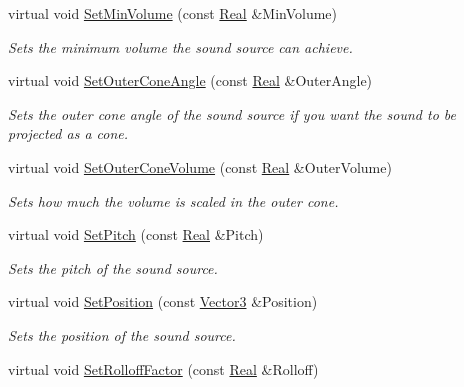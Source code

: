 \begin{DoxyCompactItemize}
virtual void \hyperlink{classMezzanine_1_1Audio_1_1Sound_aaa56d27a3dcbf2b6e8a4b3b1141ad766}{SetMinVolume} (const \hyperlink{namespaceMezzanine_a726731b1a7df72bf3583e4a97282c6f6}{Real} \&MinVolume)
\begin{DoxyCompactList}\small\item\em Sets the minimum volume the sound source can achieve. \item\end{DoxyCompactList}\item 
virtual void \hyperlink{classMezzanine_1_1Audio_1_1Sound_a9d851625bb64c7f4a77eef305464a7f7}{SetOuterConeAngle} (const \hyperlink{namespaceMezzanine_a726731b1a7df72bf3583e4a97282c6f6}{Real} \&OuterAngle)
\begin{DoxyCompactList}\small\item\em Sets the outer cone angle of the sound source if you want the sound to be projected as a cone. \item\end{DoxyCompactList}\item 
virtual void \hyperlink{classMezzanine_1_1Audio_1_1Sound_ae99b53a8dcb610bb0df055ba0cd118fa}{SetOuterConeVolume} (const \hyperlink{namespaceMezzanine_a726731b1a7df72bf3583e4a97282c6f6}{Real} \&OuterVolume)
\begin{DoxyCompactList}\small\item\em Sets how much the volume is scaled in the outer cone. \item\end{DoxyCompactList}\item 
virtual void \hyperlink{classMezzanine_1_1Audio_1_1Sound_a5c73f4cfc446e8760c5770c1e9b2c860}{SetPitch} (const \hyperlink{namespaceMezzanine_a726731b1a7df72bf3583e4a97282c6f6}{Real} \&Pitch)
\begin{DoxyCompactList}\small\item\em Sets the pitch of the sound source. \item\end{DoxyCompactList}\item 
virtual void \hyperlink{classMezzanine_1_1Audio_1_1Sound_ad4ae4db3fdf4d60391f049ff58a20668}{SetPosition} (const \hyperlink{classMezzanine_1_1Vector3}{Vector3} \&Position)
\begin{DoxyCompactList}\small\item\em Sets the position of the sound source. \item\end{DoxyCompactList}\item 
virtual void \hyperlink{classMezzanine_1_1Audio_1_1Sound_a4bb39c27ee5916b92cb09a6c3ba80db5}{SetRolloffFactor} (const \hyperlink{namespaceMezzanine_a726731b1a7df72bf3583e4a97282c6f6}{Real} \&Rolloff)

\end{DoxyCompactItemize}
